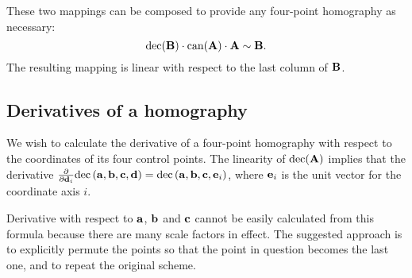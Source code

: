 These two mappings can be composed to provide any four-point homography as necessary:
$$\mathrm{dec}(\mathbf{B}) \cdot \mathrm{can}(\mathbf{A}) \cdot \mathbf{A} \sim \mathbf{B}.$$
The resulting mapping is linear with respect to the last column of $\mathbf{B}$.


\subsection{Derivatives of a homography}

We wish to calculate the derivative of a four-point homography with respect to the coordinates of its four control points.
The linearity of $\mathrm{dec}(\mathbf{A})$ implies that the derivative $\frac{\partial} {\partial \mathbf{d}_i} \mathrm{dec} \left( \mathbf{a}, \mathbf{b}, \mathbf{c}, \mathbf{d} \right) = \mathrm{dec} \left( \mathbf{a}, \mathbf{b}, \mathbf{c}, \mathbf{e}_i \right)$, where $\mathbf{e}_i$ is the unit vector for the coordinate axis $i$.

Derivative with respect to $\mathbf{a}$, $\mathbf{b}$ and $\mathbf{c}$ cannot be easily calculated from this formula because there are many scale factors in effect.
The suggested approach is to explicitly permute the points so that the point in question becomes the last one, and to repeat the original scheme.


